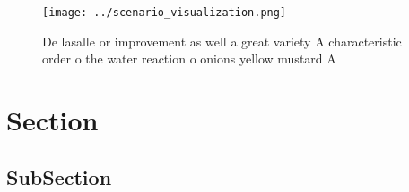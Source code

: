 \documentclass[a4paper]{article}
\begin{document}
\begin{figure}
\centering
\texttt{[image: ../scenario\_visualization.png]}
\caption{De lasalle or improvement as well a great variety A characteristic order o the water reaction o onions yellow mustard A
}
\end{figure}
 
\section{Section}

\subsection{SubSection}
\end{document}
